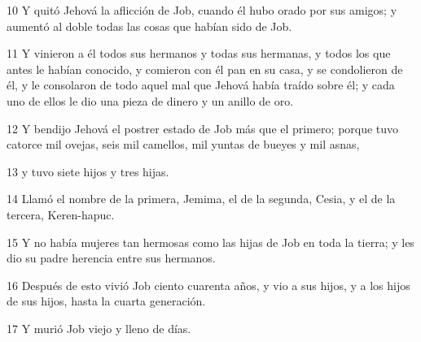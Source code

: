 \par 10 Y quitó Jehová la aflicción de Job, cuando él hubo orado por sus amigos; y aumentó al doble todas las cosas que habían sido de Job. 
\par 11 Y vinieron a él todos sus hermanos y todas sus hermanas, y todos los que antes le habían conocido, y comieron con él pan en su casa, y se condolieron de él, y le consolaron de todo aquel mal que Jehová había traído sobre él; y cada uno de ellos le dio una pieza de dinero y un anillo de oro.
\par 12 Y bendijo Jehová el postrer estado de Job más que el primero; porque tuvo catorce mil ovejas, seis mil camellos, mil yuntas de bueyes y mil asnas,
\par 13 y tuvo siete hijos y tres hijas.
\par 14 Llamó el nombre de la primera, Jemima, el de la segunda, Cesia, y el de la tercera, Keren-hapuc.
\par 15 Y no había mujeres tan hermosas como las hijas de Job en toda la tierra; y les dio su padre herencia entre sus hermanos.
\par 16 Después de esto vivió Job ciento cuarenta años, y vio a sus hijos, y a los hijos de sus hijos, hasta la cuarta generación.
\par 17 Y murió Job viejo y lleno de días.

